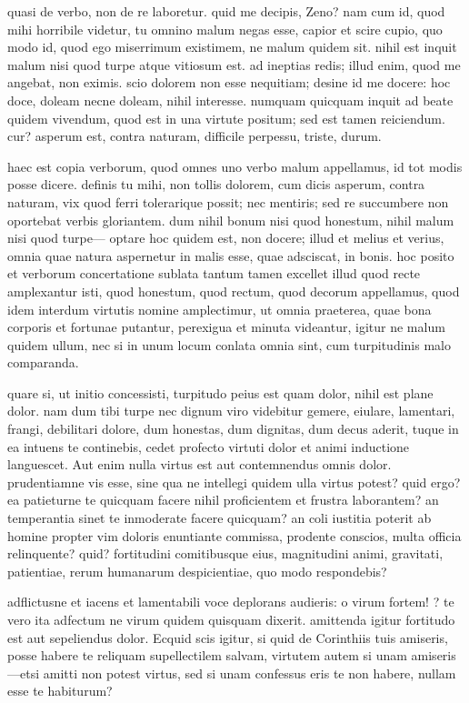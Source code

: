  quasi de verbo, non de re laboretur. quid me decipis, Zeno? nam cum id, quod mihi horribile videtur, tu omnino malum negas esse, capior et scire cupio, quo modo id, quod ego miserrimum existimem, ne malum quidem sit. nihil est inquit malum nisi quod turpe atque vitiosum est. ad ineptias redis; illud enim, quod me angebat, non eximis. scio dolorem non esse nequitiam; desine id me docere: hoc doce, doleam necne doleam, nihil interesse. numquam quicquam inquit ad beate quidem vivendum, quod est in una virtute positum; sed est tamen reiciendum. cur? asperum est, contra naturam, difficile perpessu, triste, durum.

 haec est copia verborum, quod omnes uno verbo malum appellamus, id tot modis posse dicere. definis tu mihi, non tollis dolorem, cum dicis asperum, contra naturam, vix quod ferri tolerarique possit; nec mentiris; sed re succumbere non oportebat verbis gloriantem. dum nihil bonum nisi quod honestum, nihil malum nisi quod turpe— optare hoc quidem est, non docere; illud et melius et verius, omnia quae natura aspernetur in malis esse, quae adsciscat, in bonis. hoc posito et verborum concertatione sublata tantum tamen excellet illud quod recte amplexantur isti, quod honestum, quod rectum, quod decorum appellamus, quod idem interdum virtutis nomine amplectimur, ut omnia praeterea, quae bona corporis et fortunae putantur, perexigua et minuta videantur, igitur ne malum quidem ullum, nec si in unum locum conlata omnia sint, cum turpitudinis malo comparanda.

 quare si, ut initio concessisti, turpitudo peius est quam dolor, nihil est plane dolor. nam dum tibi turpe nec dignum viro videbitur gemere, eiulare, lamentari, frangi, debilitari dolore, dum honestas, dum dignitas, dum decus aderit, tuque in ea intuens te continebis, cedet profecto virtuti dolor et animi inductione languescet. Aut enim nulla virtus est aut contemnendus omnis dolor. prudentiamne vis esse, sine qua ne intellegi quidem ulla virtus potest? quid ergo? ea patieturne te quicquam facere nihil proficientem et frustra laborantem? an temperantia sinet te inmoderate facere quicquam? an coli iustitia poterit ab homine propter vim doloris enuntiante commissa, prodente conscios, multa officia relinquente? quid? fortitudini comitibusque eius, magnitudini animi, gravitati, patientiae, rerum humanarum despicientiae, quo modo respondebis?

 adflictusne et iacens et lamentabili voce deplorans audieris: o virum fortem! ? te vero ita adfectum ne virum quidem quisquam dixerit. amittenda igitur fortitudo est aut sepeliendus dolor. Ecquid scis igitur, si quid de Corinthiis tuis amiseris, posse habere te reliquam supellectilem salvam, virtutem autem si unam amiseris—etsi amitti non potest virtus, sed si unam confessus eris te non habere, nullam esse te habiturum?

